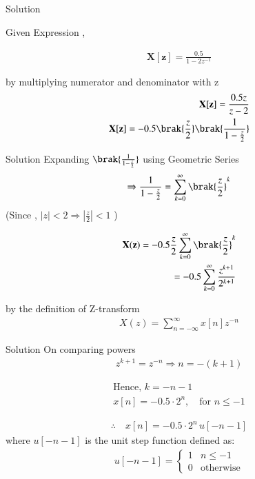 \documentclass{beamer}
\begin{document}
\begin{frame}{Solution}


Given Expression , 


\begin{align}
    \mathbf{X[z]} = \frac{0.5}{1 - 2 z ^{-1}} 
\end{align}

by multiplying numerator and denominator with z 
\begin{align}
    \mathbf{X[z]} = \frac{0.5z}{z-2} \\
    \mathbf{X[z]} = -0.5\brak{\frac{z}{2}}\brak{\frac{1}{1-\frac{z}{2}}}
\end{align}
\end{frame}

\begin{frame}{Solution}
Expanding $\brak{\frac{1}{1-\frac{z}{2}}}$ using Geometric Series
\begin{align}
\Rightarrow \frac{1}{1 - \frac{z}{2}} = \sum_{k=0}^{\infty} \brak{\frac{z}{2}}^k
\end{align}
(Since , $|z| < 2  \Rightarrow   |\frac{z}{2}| < 1 $ )

\begin{align}
\mathbf{X(z)} = -0.5  \frac{z}{2} \sum_{k=0}^{\infty} \brak{\frac{z}{2}}^k \\
= -0.5 \sum_{k=0}^{\infty} \frac{z^{k+1}}{2^{k+1}}
\end{align}

by the definition of Z-transform 
\begin{align}
X(z) = \sum_{n=-\infty}^{\infty} x[n] z^{-n}
\end{align}



\end{frame}

\begin{frame}{Solution}
On comparing powers
\begin{align}
z^{k+1} = z^{-n} \Rightarrow n = -(k+1)
\end{align}

\begin{align}
\text{Hence, } k = -n - 1 \\
x[n] = -0.5 \cdot 2^n, \quad \text{for } n \le -1
\end{align}

\begin{align}
\therefore \quad 
x[n] = -0.5 \cdot 2^n \, u[-n-1]
\end{align}
where $u[-n-1]$ is the unit step function defined as:
\begin{align}
u[-n-1] = \begin{cases} 
1 & n \leq -1 \\ 
0 & \text{otherwise} 
\end{cases}
\end{align}
\end{frame}
\end{document}
